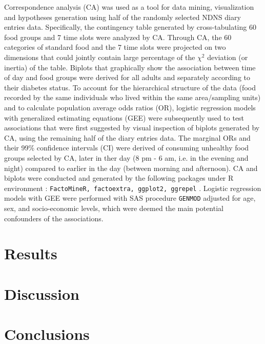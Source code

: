 \documentclass{bmcart}
\begin{document}
Correspondence analysis (CA) \cite{greenacre2017correspondence,Chapman2017,palla2020adolescents} was used as a tool for data mining, visualization and hypotheses generation using half of the randomly selected NDNS diary entries data. Specifically, the contingency table generated by cross-tabulating 60 food groups and 7 time slots were analyzed by CA. Through CA, the 60 categories of standard food and the 7 time slots were projected on two dimensions that could jointly contain large percentage of the $\chi^2$ deviation (or inertia) of the table. Biplots that graphically show the association between time of day and food groups were derived for all adults and separately according to their diabetes status. To account for the hierarchical structure of the data (food recorded by the same individuals who lived within the same area/sampling units) and to calculate population average odds ratios (OR), logistic regression models with generalized estimating equations (GEE) were subsequently used to test associations that were first suggested by visual inspection of biplots generated by CA, using the remaining half of the diary entries data. The marginal ORs and their 99\% confidence intervals (CI) were derived of consuming unhealthy food groups selected by CA, later in ther day (8 pm - 6 am, i.e. in the evening and night) compared to earlier in the day (between morning and afternoon). CA and biplots were conducted and generated by the following packages under R environment \cite{Rcoreteam}: \texttt{FactoMineR, factoextra, ggplot2, ggrepel} \cite{L__2008,factoextra,ggplot2,ggrepel}. Logistic regression models with GEE were performed with SAS procedure \texttt{GENMOD} \cite{SAS94} adjusted for age, sex, and socio-economic levels, which were deemed the main potential confounders of the associations. 


\section*{Results}


\section*{Discussion}


\section*{Conclusions}
\end{document}
